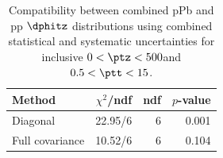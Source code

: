 \begin{table}[htp!]
\centering
\begin{tabular}{|l|r|r|r|}
\hline
Method & $\chi^2$/ndf & ndf & $p$-value \\
\hline
Diagonal & 22.95/6 & 6 & 0.001 \\
Full covariance & 10.52/6 & 6 & 0.104 \\
\hline
\end{tabular}
\caption{Compatibility between combined pPb and pp $\dphitz$ distributions using combined statistical and systematic uncertainties for inclusive $0 < \ptz < 500$\GeV and $0.5 < \ptt < 15$\GeV.}
\label{table:chisq_dphi}
\end{table}
